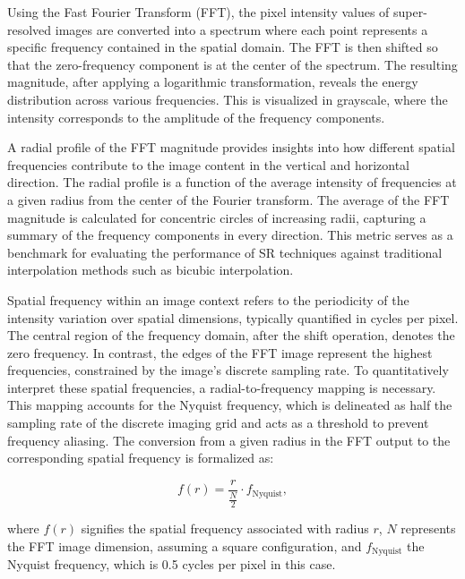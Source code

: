         Using the Fast Fourier Transform (FFT), the pixel intensity values of super-resolved images are converted into a spectrum where each point represents a specific frequency contained in the spatial domain.
        The FFT is then shifted so that the zero-frequency component is at the center of the spectrum. 
        The resulting magnitude, after applying a logarithmic transformation, reveals the energy distribution across various frequencies.
        This is visualized in grayscale, where the intensity corresponds to the amplitude of the frequency components.
        
        A radial profile of the FFT magnitude provides insights into how different spatial frequencies contribute to the image content in the vertical and horizontal direction.
        The radial profile is a function of the average intensity of frequencies at a given radius from the center of the Fourier transform.
        The average of the FFT magnitude is calculated for concentric circles of increasing radii, capturing a summary of the frequency components in every direction.
        This metric serves as a benchmark for evaluating the performance of SR techniques against traditional interpolation methods such as bicubic interpolation.
        
        Spatial frequency within an image context refers to the periodicity of the intensity variation over spatial dimensions, typically quantified in cycles per pixel. The central region of the frequency domain, after the shift operation, denotes the zero frequency. In contrast, the edges of the FFT image represent the highest frequencies, constrained by the image's discrete sampling rate.
        To quantitatively interpret these spatial frequencies, a radial-to-frequency mapping is necessary. This mapping accounts for the Nyquist frequency, which is delineated as half the sampling rate of the discrete imaging grid and acts as a threshold to prevent frequency aliasing.
        The conversion from a given radius in the FFT output to the corresponding spatial frequency is formalized as:

        \begin{equation}
            f(r) = \frac{r}{\frac{N}{2}} \cdot f_{\text{Nyquist}},
        \end{equation}

        where \( f(r) \) signifies the spatial frequency associated with radius \( r \), \( N \) represents the FFT image dimension, assuming a square configuration, and \( f_{\text{Nyquist}} \) the Nyquist frequency, which is 0.5 cycles per pixel in this case.


